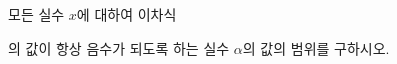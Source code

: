 모든 실수 $x$에 대하여 이차식 \par\smallskip{}\par\smallskip\noindent 의 값이 항상 음수가 되도록 하는 실수 $\alpha$의 값의 범위를 구하시오.
